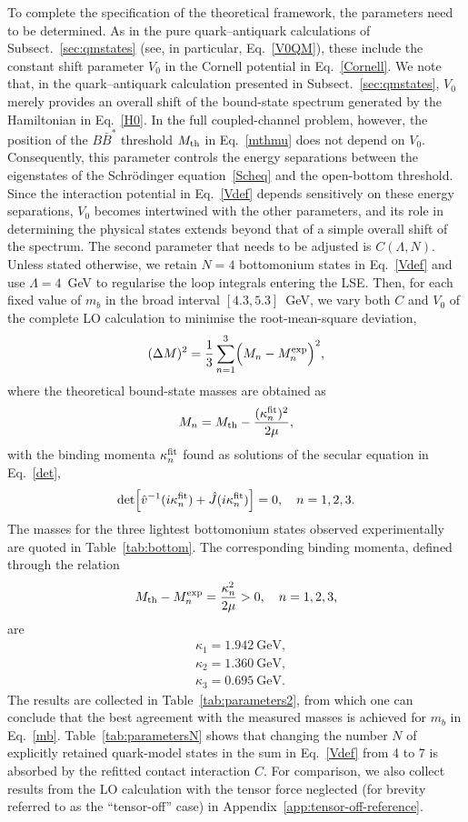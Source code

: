 \documentclass[aps,prd,showpacs,amsmath,twocolumn,superscriptaddress,floatfix,nofootinbib,notitlepage]{revtex4-2}
\newcommand{\GeV}{\mathrm{GeV}}
\newcommand{\be}{\begin{equation}}
\newcommand{\ee}{\end{equation}}
\begin{document}
To complete the specification of the theoretical framework, the parameters need to be determined. As in the pure quark--antiquark calculations of Subsect.~\ref{sec:qmstates} (see, in particular, Eq.~\eqref{V0QM}), these include the constant shift parameter $V_0$ in the Cornell potential in Eq.~\eqref{Cornell}.
We note that, in the quark--antiquark calculation presented in Subsect.~\ref{sec:qmstates}, $V_0$ merely provides an overall shift of the bound-state spectrum generated by the Hamiltonian in Eq.~\eqref{H0}. In the full coupled-channel problem, however, the position of the $B\bar{B}^*$ threshold $M_{\rm th}$ in Eq.~\eqref{mthmu} does not depend on $V_0$. Consequently, this parameter controls the energy separations between the eigenstates of the Schr{\"o}dinger equation~\eqref{Scheq} and the open-bottom threshold. Since the interaction potential in Eq.~\eqref{Vdef} depends sensitively on these energy separations, $V_0$ becomes intertwined with the other parameters, and its role in determining the physical states extends beyond that of a simple overall shift of the spectrum.
The second parameter that needs to be adjusted is $C(\Lambda,N)$. Unless stated otherwise, we retain $N=4$ bottomonium states in Eq.~\eqref{Vdef} and use $\Lambda=4$~GeV to regularise the loop integrals entering the LSE. Then, 
for each fixed value of $m_b$ in the broad interval $[4.3,5.3]$~GeV, we vary both $C$ and $V_0$ of the complete LO calculation to minimise the root-mean-square deviation, 
\be
(\Delta M)^2=\frac13\sum_{n=1}^3\Bigl(M_n-M_n^{\rm exp}\Bigr)^2,
\label{dM}
\ee
where the theoretical bound-state masses are obtained as
\be
M_n=M_{\rm th}-\frac{(\kappa_n^{\rm fit})^2}{2\mu},
\ee
with the binding momenta $\kappa_n^{\rm fit}$ found as solutions of the secular equation in Eq.~\eqref{det},
\be 
\mbox{det}\!\left[\hat{v}^{-1}(i\kappa_n^{\rm fit})+\hat{J}(i\kappa_n^{\rm fit})\right]=0, \quad n=1,2,3. \label{mincond} 
\ee
The masses for the three lightest bottomonium states observed experimentally~\cite{ParticleDataGroup:2026mpi} are quoted in Table~\ref{tab:bottom}. 
The corresponding binding momenta, defined through the relation
\be
M_{\rm th}-M_n^{\rm exp}=\frac{\kappa_n^2}{2\mu}>0,\quad n=1,2,3,
\label{gammas}
\ee
are
\be
\begin{split}
&\kappa_1=1.942~\GeV,\\
&\kappa_2=1.360~\GeV,\\
&\kappa_3=0.695~\GeV.
\label{gammas123}
\end{split}
\ee
The results are collected in Table~\ref{tab:parameters2}, from which one can conclude that the best agreement with the measured masses is achieved for $m_b$ in Eq.~\eqref{mb}. Table~\ref{tab:parametersN} shows that changing the number $N$ of explicitly retained quark-model states in the sum in Eq.~\eqref{Vdef} from 4 to 7 is absorbed by the refitted contact interaction $C$. For comparison, we also collect results from the LO calculation with the tensor force neglected (for brevity referred to as the ``tensor-off'' case) in Appendix~\ref{app:tensor-off-reference}.
\end{document}
